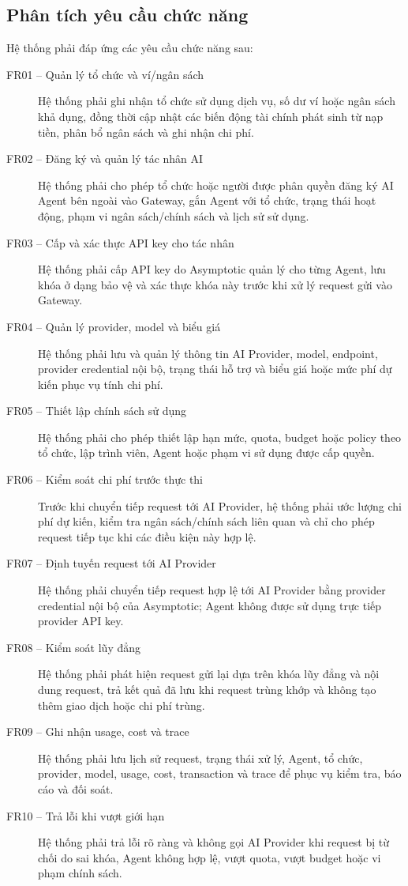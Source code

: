 
\subsection*{Phân tích yêu cầu chức năng}

Hệ thống phải đáp ứng các yêu cầu chức năng sau:

\begin{description}
    \item[FR01 -- Quản lý tổ chức và ví/ngân sách] Hệ thống phải ghi nhận tổ chức sử dụng dịch vụ, số dư ví hoặc ngân sách khả dụng, đồng thời cập nhật các biến động tài chính phát sinh từ nạp tiền, phân bổ ngân sách và ghi nhận chi phí.
    \item[FR02 -- Đăng ký và quản lý tác nhân AI] Hệ thống phải cho phép tổ chức hoặc người được phân quyền đăng ký AI Agent bên ngoài vào Gateway, gắn Agent với tổ chức, trạng thái hoạt động, phạm vi ngân sách/chính sách và lịch sử sử dụng.
    \item[FR03 -- Cấp và xác thực API key cho tác nhân] Hệ thống phải cấp API key do Asymptotic quản lý cho từng Agent, lưu khóa ở dạng bảo vệ và xác thực khóa này trước khi xử lý request gửi vào Gateway.
    \item[FR04 -- Quản lý provider, model và biểu giá] Hệ thống phải lưu và quản lý thông tin AI Provider, model, endpoint, provider credential nội bộ, trạng thái hỗ trợ và biểu giá hoặc mức phí dự kiến phục vụ tính chi phí.
    \item[FR05 -- Thiết lập chính sách sử dụng] Hệ thống phải cho phép thiết lập hạn mức, quota, budget hoặc policy theo tổ chức, lập trình viên, Agent hoặc phạm vi sử dụng được cấp quyền.
    \item[FR06 -- Kiểm soát chi phí trước thực thi] Trước khi chuyển tiếp request tới AI Provider, hệ thống phải ước lượng chi phí dự kiến, kiểm tra ngân sách/chính sách liên quan và chỉ cho phép request tiếp tục khi các điều kiện này hợp lệ.
    \item[FR07 -- Định tuyến request tới AI Provider] Hệ thống phải chuyển tiếp request hợp lệ tới AI Provider bằng provider credential nội bộ của Asymptotic; Agent không được sử dụng trực tiếp provider API key.
    \item[FR08 -- Kiểm soát lũy đẳng] Hệ thống phải phát hiện request gửi lại dựa trên khóa lũy đẳng và nội dung request, trả kết quả đã lưu khi request trùng khớp và không tạo thêm giao dịch hoặc chi phí trùng.
    \item[FR09 -- Ghi nhận usage, cost và trace] Hệ thống phải lưu lịch sử request, trạng thái xử lý, Agent, tổ chức, provider, model, usage, cost, transaction và trace để phục vụ kiểm tra, báo cáo và đối soát.
    \item[FR10 -- Trả lỗi khi vượt giới hạn] Hệ thống phải trả lỗi rõ ràng và không gọi AI Provider khi request bị từ chối do sai khóa, Agent không hợp lệ, vượt quota, vượt budget hoặc vi phạm chính sách.
\end{description}

